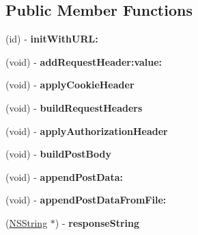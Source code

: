 \subsection*{Public Member Functions}
\begin{DoxyCompactItemize}
\item 
\hypertarget{interface_a_s_i_h_t_t_p_request_aec75eeba26544a9da35e795011fe4a42}{
(id) -\/ {\bfseries initWithURL:}}
\label{interface_a_s_i_h_t_t_p_request_aec75eeba26544a9da35e795011fe4a42}

\item 
\hypertarget{interface_a_s_i_h_t_t_p_request_a0e969f091acb07bbbe6dbc9295260d64}{
(void) -\/ {\bfseries addRequestHeader:value:}}
\label{interface_a_s_i_h_t_t_p_request_a0e969f091acb07bbbe6dbc9295260d64}

\item 
\hypertarget{interface_a_s_i_h_t_t_p_request_a96645d25afb711168d8722089ad0da60}{
(void) -\/ {\bfseries applyCookieHeader}}
\label{interface_a_s_i_h_t_t_p_request_a96645d25afb711168d8722089ad0da60}

\item 
\hypertarget{interface_a_s_i_h_t_t_p_request_a84fd344945df932bb1499066a6136b44}{
(void) -\/ {\bfseries buildRequestHeaders}}
\label{interface_a_s_i_h_t_t_p_request_a84fd344945df932bb1499066a6136b44}

\item 
\hypertarget{interface_a_s_i_h_t_t_p_request_a585f10faa599a2d9c27a5013653901e8}{
(void) -\/ {\bfseries applyAuthorizationHeader}}
\label{interface_a_s_i_h_t_t_p_request_a585f10faa599a2d9c27a5013653901e8}

\item 
\hypertarget{interface_a_s_i_h_t_t_p_request_a03e252428a7cee3ce6c67a33d93adfb4}{
(void) -\/ {\bfseries buildPostBody}}
\label{interface_a_s_i_h_t_t_p_request_a03e252428a7cee3ce6c67a33d93adfb4}

\item 
\hypertarget{interface_a_s_i_h_t_t_p_request_ad74dabdd3aeb97b1cfcf95a05fea9bcc}{
(void) -\/ {\bfseries appendPostData:}}
\label{interface_a_s_i_h_t_t_p_request_ad74dabdd3aeb97b1cfcf95a05fea9bcc}

\item 
\hypertarget{interface_a_s_i_h_t_t_p_request_a5496e23e12b1ec7d6d02a78aa6777d10}{
(void) -\/ {\bfseries appendPostDataFromFile:}}
\label{interface_a_s_i_h_t_t_p_request_a5496e23e12b1ec7d6d02a78aa6777d10}

\item 
\hypertarget{interface_a_s_i_h_t_t_p_request_ab07f5cdd4072ee67681bea30d8714fdd}{
(\hyperlink{class_n_s_string}{NSString} $\ast$) -\/ {\bfseries responseString}}
\label{interface_a_s_i_h_t_t_p_request_ab07f5cdd4072ee67681bea30d8714fdd}


\end{DoxyCompactItemize}
